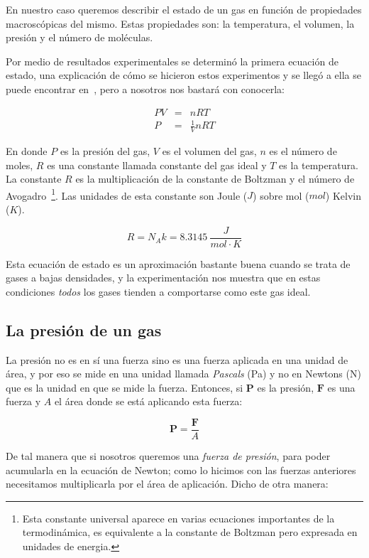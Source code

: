 En nuestro caso queremos describir el estado de un gas en función de propiedades macroscópicas del mismo.
Estas propiedades son: la temperatura, el volumen, la presión y el número de moléculas.

Por medio de resultados experimentales se determinó la primera ecuación de estado, una explicación de cómo se hicieron estos experimentos y se llegó a ella se puede encontrar en~\cite{Resnick:Fisica}, pero a nosotros nos bastará con conocerla:

\begin{eqnarray}
PV & = & nRT \nonumber \\
P & = & \frac{1}{V}nRT
\end{eqnarray}

En donde $P$ es la presión del gas, $V$ es el volumen del gas, $n$ es el número de moles, $R$ es una constante llamada constante del gas ideal y $T$ es la temperatura.
La constante $R$ es la multiplicación de la constante de Boltzman y el número de Avogadro~\footnote{Esta constante universal aparece en varias ecuaciones importantes de la termodinámica, es equivalente a la constante de Boltzman pero expresada en unidades de energia.}.
Las unidades de esta constante son Joule ($J$) sobre mol ($mol$) Kelvin ($K$).

$$ R = N_A k = 8.3145 \ \frac{J}{mol \cdot K}$$

Esta ecuación de estado es un aproximación bastante buena cuando se trata de gases a bajas densidades, y la experimentación nos muestra que en estas condiciones \emph{todos} los gases tienden a comportarse como este gas ideal.

\subsection{La presión de un gas}

La presión no es en sí una fuerza sino es una fuerza aplicada en una unidad de área, y por eso se mide en una unidad llamada \emph{Pascals} (Pa) y no en Newtons (N) que es la unidad en que se mide la fuerza.
Entonces, si $\textbf{P}$ es la presión, $\textbf{F}$ es una fuerza y $A$ el área donde se está aplicando esta fuerza:

$$ \textbf{P} = \frac{\textbf{F}}{A} $$

De tal manera que si nosotros queremos una \emph{fuerza de presión}, para poder acumularla en la ecuación de Newton; como lo hicimos con las fuerzas anteriores necesitamos multiplicarla por el área de aplicación.
Dicho de otra manera:

